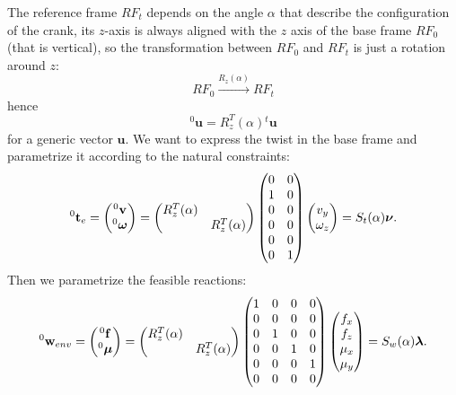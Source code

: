 \documentclass[10pt, a4paper]{report}
\begin{document}
The reference frame $RF_t$ depends on the angle $\alpha$ that describe the configuration of the crank, its $z$-axis is always aligned with the $z$ axis of the base frame $RF_0$ (that is vertical), so the transformation between $RF_0$ and $RF_t$ is just a rotation around $z$:\begin{equation}
    RF_0\xrightarrow{R_z(\alpha)}RF_t
\end{equation}
hence\begin{equation}
    {}^0\mathbf u=R_z^T(\alpha){}^t\mathbf u 
\end{equation}
for a generic vector $\mathbf u$. We want to express the twist in the base frame and parametrize it according to the natural constraints:\begin{equation}
    {}^0\mathbf t_e=\begin{pmatrix}
        {}^0\mathbf v\\{}^0{\boldsymbol{\omega}} 
    \end{pmatrix}=\begin{pmatrix}
        R_z^T(\alpha)&\\ 
        &R_z^T(\alpha)
    \end{pmatrix}\begin{pmatrix}
        0&0\\
        1&0\\
        0&0\\
        0&0\\
        0&0\\
        0&1
    \end{pmatrix}\begin{pmatrix}
        v_y\\ \omega_z 
    \end{pmatrix}=S_t(\alpha){\boldsymbol{\nu}}.
\end{equation}
Then we parametrize the feasible reactions:\begin{equation}
    {}^0\mathbf w_{env}=\begin{pmatrix}
        {}^0\mathbf f\\{}^0{\boldsymbol{\mu}} 
    \end{pmatrix}=\begin{pmatrix}
        R_z^T(\alpha)&\\ 
        &R_z^T(\alpha)
    \end{pmatrix}\begin{pmatrix}
        1&0&0&0\\
        0&0&0&0\\
        0&1&0&0\\
        0&0&1&0\\
        0&0&0&1\\
        0&0&0&0
    \end{pmatrix}\begin{pmatrix}
        f_x\\ f_z\\\mu_x\\\mu_y
    \end{pmatrix}=S_w(\alpha){\boldsymbol{\lambda}}.
\end{equation}
\end{document}

